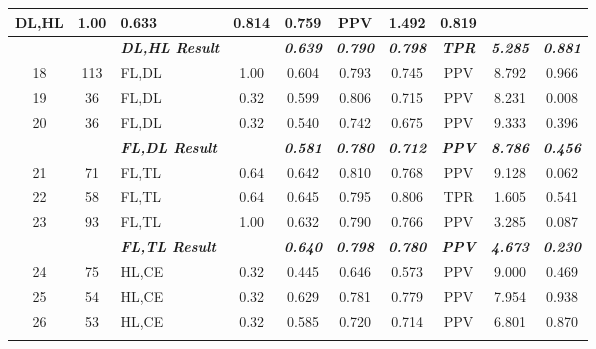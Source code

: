\begin{table}[H]
{\begin{tabular}{cc|l|c|c|c|c|c|c|c|}
    DL,HL &
    1.00 &
    0.633 &
    0.814 &
    0.759 &
    PPV &
    1.492 &
    0.819 \\ \hline
   &
     &
    \textit{\textbf{DL,HL Result}} &
     &
    \textit{\textbf{0.639}} &
    \textit{\textbf{0.790}} &
    \textit{\textbf{0.798}} &
    \textit{\textbf{TPR}} &
    \textit{\textbf{5.285}} &
    \textit{\textbf{0.881}} \\ \hline
  \multicolumn{1}{|c|}{18} &
    113 &
    FL,DL &
    1.00 &
    0.604 &
    0.793 &
    0.745 &
    PPV &
    8.792 &
    0.966 \\ \hline
  \multicolumn{1}{|c|}{19} &
    36 &
    FL,DL &
    0.32 &
    0.599 &
    0.806 &
    0.715 &
    PPV &
    8.231 &
    0.008 \\ \hline
  \multicolumn{1}{|c|}{20} &
    36 &
    FL,DL &
    0.32 &
    0.540 &
    0.742 &
    0.675 &
    PPV &
    9.333 &
    0.396 \\ \hline
   &
     &
    \textit{\textbf{FL,DL Result}} &
     &
    \textit{\textbf{0.581}} &
    \textit{\textbf{0.780}} &
    \textit{\textbf{0.712}} &
    \textit{\textbf{PPV}} &
    \textit{\textbf{8.786}} &
    \textit{\textbf{0.456}} \\ \hline
  \multicolumn{1}{|c|}{21} &
    71 &
    FL,TL &
    0.64 &
    0.642 &
    0.810 &
    0.768 &
    PPV &
    9.128 &
    0.062 \\ \hline
  \multicolumn{1}{|c|}{22} &
    58 &
    FL,TL &
    0.64 &
    0.645 &
    0.795 &
    0.806 &
    TPR &
    1.605 &
    0.541 \\ \hline
  \multicolumn{1}{|c|}{23} &
    93 &
    FL,TL &
    1.00 &
    0.632 &
    0.790 &
    0.766 &
    PPV &
    3.285 &
    0.087 \\ \hline
   &
     &
    \textit{\textbf{FL,TL Result}} &
     &
    \textit{\textbf{0.640}} &
    \textit{\textbf{0.798}} &
    \textit{\textbf{0.780}} &
    \textit{\textbf{PPV}} &
    \textit{\textbf{4.673}} &
    \textit{\textbf{0.230}} \\ \hline
  \multicolumn{1}{|c|}{24} &
    75 &
    HL,CE &
    0.32 &
    0.445 &
    0.646 &
    0.573 &
    PPV &
    9.000 &
    0.469 \\ \hline
  \multicolumn{1}{|c|}{25} &
    54 &
    HL,CE &
    0.32 &
    0.629 &
    0.781 &
    0.779 &
    PPV &
    7.954 &
    0.938 \\ \hline
  \multicolumn{1}{|c|}{26} &
    53 &
    HL,CE &
    0.32 &
    0.585 &
    0.720 &
    0.714 &
    PPV &
    6.801 &
    0.870 \\ \hline
   &

\end{tabular}}
\end{table}
